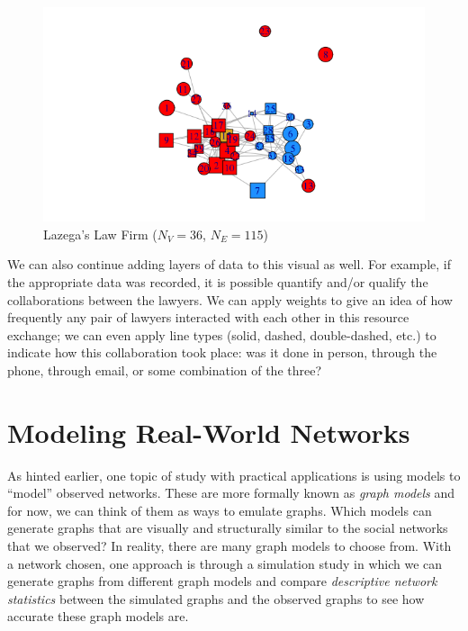\documentclass[12pt,twoside]{amherstthesis}
\begin{document}
  \begin{figure}[htbp]
  \centering
  \includegraphics{figure/02lawyerplot.png}
  \caption{Lazega's Law Firm (\(N_V = 36\), \(N_E = 115\))}
  \end{figure}
  
  We can also continue adding layers of data to this visual as well. For
  example, if the appropriate data was recorded, it is possible quantify
  and/or qualify the collaborations between the lawyers. We can apply
  weights to give an idea of how frequently any pair of lawyers interacted
  with each other in this resource exchange; we can even apply line types
  (solid, dashed, double-dashed, etc.) to indicate how this collaboration
  took place: was it done in person, through the phone, through email, or
  some combination of the three?
  
  \section{Modeling Real-World
  Networks}\label{modeling-real-world-networks}
  
  As hinted earlier, one topic of study with practical applications is
  using models to ``model'' observed networks. These are more formally
  known as \emph{graph models} and for now, we can think of them as ways
  to emulate graphs. Which models can generate graphs that are visually
  and structurally similar to the social networks that we observed? In
  reality, there are many graph models to choose from. With a network
  chosen, one approach is through a simulation study in which we can
  generate graphs from different graph models and compare
  \emph{descriptive network statistics} between the simulated graphs and
  the observed graphs to see how accurate these graph models are.
  
\end{document}
